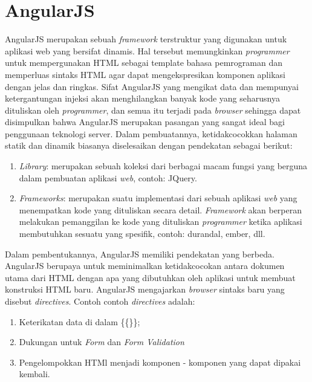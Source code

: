 \section{AngularJS}
\label{sec: angularJS}

AngularJS\cite{AngularJSDocs} merupakan sebuah \textit{framework} terstruktur yang digunakan untuk aplikasi web yang bersifat dinamis. Hal tersebut memungkinkan \textit{programmer} untuk mempergunakan HTML sebagai template bahasa pemrograman dan memperluas sintaks HTML agar dapat mengekspresikan komponen aplikasi dengan jelas dan ringkas. Sifat AngularJS yang mengikat data dan mempunyai ketergantungan injeksi akan menghilangkan banyak kode yang seharusnya dituliskan oleh \textit{programmer}, dan semua itu terjadi pada \textit{browser} sehingga dapat disimpulkan bahwa AngularJS merupakan pasangan yang sangat ideal bagi penggunaan teknologi server. 
Dalam pembuatannya, ketidakcocokkan halaman statik dan dinamik biasanya diselesaikan dengan pendekatan sebagai berikut:
\begin{enumerate}
	\item \textit{Library}: merupakan sebuah koleksi dari berbagai macam fungsi yang berguna dalam pembuatan aplikasi \textit{web}, contoh: JQuery.
	\item \textit{Frameworks}: merupakan suatu implementasi dari sebuah aplikasi \textit{web} yang menempatkan kode yang dituliskan secara detail. \textit{Framework} akan berperan melakukan pemanggilan ke kode yang dituliskan \textit{programmer} ketika aplikasi membutuhkan sesuatu yang spesifik, contoh: durandal, ember, dll.
\end{enumerate}

Dalam pembentukannya, AngularJS memiliki pendekatan yang berbeda. AngularJS berupaya untuk meminimalkan ketidakcocokan antara dokumen utama dari HTML dengan apa yang dibutuhkan oleh aplikasi untuk membuat konstruksi HTML baru. AngularJS mengajarkan \textit{browser} sintaks baru yang disebut \textit{directives}. Contoh contoh \textit{directives} adalah:
\begin{enumerate}
	\item Keterikatan data di dalam \{\{\}\};
	\item Dukungan untuk \textit{Form} dan \textit{Form Validation}
	\item Pengelompokkan HTMl menjadi komponen - komponen yang dapat dipakai kembali.
\end{enumerate}

